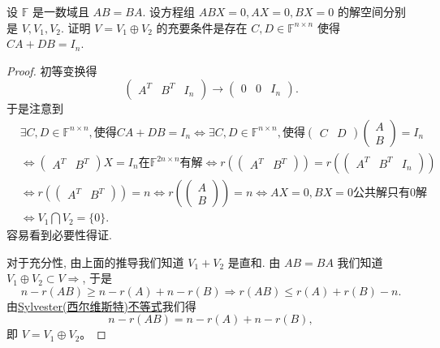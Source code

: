 \documentclass[../../main.tex]{subfiles}
\begin{document}
\begin{example}
设 \( \mathbb{F} \) 是一数域且 \( AB = BA \). 设方程组 \( ABX = 0, AX = 0, BX = 0 \) 的解空间分别是 \( V, V_1, V_2 \). 证明 \( V = V_1 \oplus V_2 \) 的充要条件是存在 \( C, D \in \mathbb{F}^{n \times n} \) 使得 \( CA + DB = I_n \).
\end{example}
\begin{proof}
初等变换得
\[
\begin{pmatrix} A^T & B^T & I_n \end{pmatrix} \to \begin{pmatrix} 0 & 0 & I_n \end{pmatrix}.
\]
于是注意到
\[
\begin{aligned}
&\exists C, D \in \mathbb{F}^{n \times n}, \text{使得} CA + DB = I_n \iff \exists C, D \in \mathbb{F}^{n \times n}, \text{使得} \begin{pmatrix} C & D \end{pmatrix} \begin{pmatrix} A \\ B \end{pmatrix} = I_n \\
&\iff \begin{pmatrix} A^T & B^T \end{pmatrix} X = I_n \text{在} \mathbb{F}^{2n \times n} \text{有解} \iff r\left( \begin{pmatrix} A^T & B^T \end{pmatrix} \right) = r\left( \begin{pmatrix} A^T & B^T & I_n \end{pmatrix} \right) \\
&\iff r\left( \begin{pmatrix} A^T & B^T \end{pmatrix} \right) = n \iff r\left( \begin{pmatrix} A \\ B \end{pmatrix} \right) = n \iff AX = 0, BX = 0 \text{公共解只有} 0 \text{解} \\
&\iff V_1 \bigcap V_2 = \{0\}.
\end{aligned}
\]
容易看到必要性得证.

对于充分性, 由上面的推导我们知道 \( V_1 + V_2 \) 是直和. 由 \( AB = BA \) 我们知道 \( V_1 \oplus V_2 \subset V \Rightarrow \), 于是
\[
n-r(AB)\geqslant n-r(A)+n-r(B)\Rightarrow r(AB)\leqslant r(A)+r(B)-n.
\]
由\hyperref[proposition:Sylvester(西尔维斯特)不等式]{Sylvester(西尔维斯特)不等式}我们得
\[
n - r(AB) = n - r(A) + n - r(B),
\]
即 \( V = V_1 \oplus V_2 \)。
\end{proof}
\end{document}
